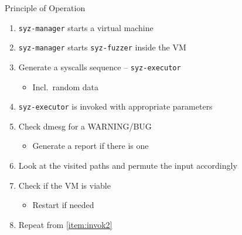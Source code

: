 \begin{frame}{\syz}{Principle of Operation}

  \begin{enumerate}
    \item \texttt{syz-manager} starts a virtual machine

    \pause

    \item \texttt{syz-manager} starts \texttt{syz-fuzzer} inside the VM

    \pause

    \item \label{item:invok2} Generate a syscalls sequence --
      \texttt{syz-executor}
    \begin{itemize}
      \item Incl.\ random data
    \end{itemize}

    \pause

    \item \texttt{syz-executor} is invoked with appropriate
      parameters

    \pause

    \item Check dmesg for a WARNING/BUG
    \begin{itemize}
      \item Generate a report if there is one
    \end{itemize}

    \pause

    \item Look at the visited paths and permute the input accordingly

    \pause

    \item Check if the VM is viable
    \begin{itemize}
      \item Restart if needed
    \end{itemize}

    \pause

    \item Repeat from \ref{item:invok2}
  \end{enumerate}

\end{frame}

